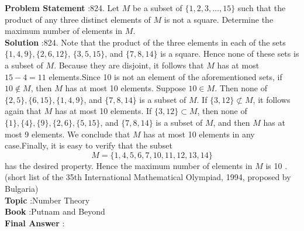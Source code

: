 \documentclass[10pt]{article}
\begin{document}
\textbf{Problem Statement} :824. Let $M$ be a subset of $\{1,2,3, \ldots, 15\}$ such that the product of any three distinct elements of $M$ is not a square. Determine the maximum number of elements in $M$.\\
\textbf{Solution} :824. Note that the product of the three elements in each of the sets $\{1,4,9\},\{2,6,12\}$, $\{3,5,15\}$, and $\{7,8,14\}$ is a square. Hence none of these sets is a subset of $M$. Because they are disjoint, it follows that $M$ has at most $15-4=11$ elements.Since 10 is not an element of the aforementioned sets, if $10 \notin M$, then $M$ has at most 10 elements. Suppose $10 \in M$. Then none of $\{2,5\},\{6,15\},\{1,4,9\}$, and $\{7,8,14\}$ is a subset of $M$. If $\{3,12\} \not \subset M$, it follows again that $M$ has at most 10 elements. If $\{3,12\} \subset M$, then none of $\{1\},\{4\},\{9\},\{2,6\},\{5,15\}$, and $\{7,8,14\}$ is a subset of $M$, and then $M$ has at most 9 elements. We conclude that $M$ has at most 10 elements in any case.Finally, it is easy to verify that the subset$$ M=\{1,4,5,6,7,10,11,12,13,14\} $$has the desired property. Hence the maximum number of elements in $M$ is 10 .(short list of the 35th International Mathematical Olympiad, 1994, proposed by Bulgaria)\\
\textbf{Topic} :Number Theory\\
\textbf{Book} :Putnam and Beyond\\
\textbf{Final Answer} :\\
\end{document}
